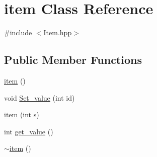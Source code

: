 \hypertarget{classitem}{\section{item Class Reference}
\label{classitem}
}


{\ttfamily \#include $<$Item.\+hpp$>$}

\subsection*{Public Member Functions}
\begin{DoxyCompactItemize}
\item 
\hyperlink{classitem_a344fbf6e3db0d59e0c8ac75cd42ee144}{item} ()
\item 
void \hyperlink{classitem_a2ffe516ed0acc8638af2d743fce0cbb0}{Set\+\_\+value} (int id)
\item 
\hyperlink{classitem_ac8395f04ecf257cd8a80e15f8ceb53fe}{item} (int s)
\item 
int \hyperlink{classitem_a7ceb113f8aa1662fbf74b53714d65da7}{get\+\_\+value} ()
\item 
\hyperlink{classitem_ae1792174ea9d664d6413f5ad0de38d74}{$\sim$item} ()
\end{DoxyCompactItemize}


